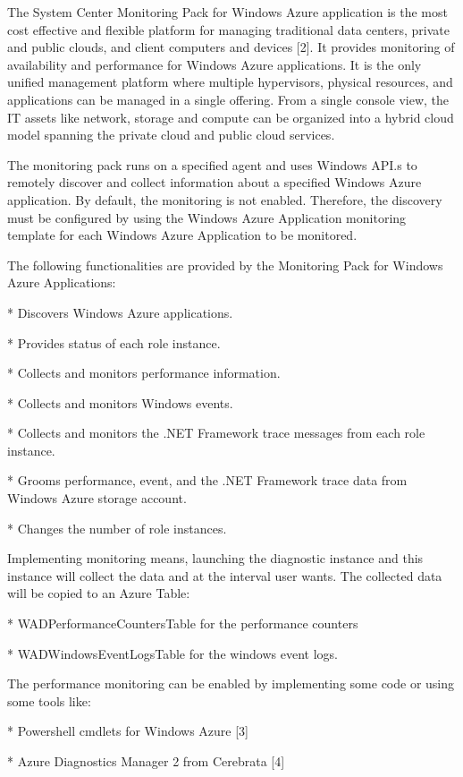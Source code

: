 \documentclass{sig-alternate}
\begin{document}
The System Center Monitoring Pack for Windows Azure application is the most cost effective and flexible platform for managing traditional data centers, private and public clouds, and client computers and devices [2]. It provides monitoring of availability and performance for Windows Azure applications. It is the only unified management platform where multiple hypervisors, physical resources, and applications can be managed in a single offering. From a single console view, the IT assets like network, storage and compute can be organized into a hybrid cloud model spanning the private cloud and public cloud services.

The monitoring pack runs on a specified agent and uses Windows API.s to remotely discover and collect information about a specified Windows Azure application. By default, the monitoring is not enabled. Therefore, the discovery must be configured by using the Windows Azure Application monitoring template for each Windows Azure Application to be monitored.

The following functionalities are provided by the Monitoring Pack for Windows Azure Applications:

* Discovers Windows Azure applications.

* Provides status of each role instance.

* Collects and monitors performance information.

* Collects and monitors Windows events.

* Collects and monitors the .NET Framework trace messages from each role instance.

* Grooms performance, event, and the .NET Framework trace data from Windows Azure storage account.

* Changes the number of role instances.

Implementing monitoring means, launching the diagnostic instance and this instance will collect the data and at the interval user wants. The collected data will be copied to an Azure Table:

* WADPerformanceCountersTable for the performance counters

* WADWindowsEventLogsTable for the windows event logs.

The performance monitoring can be enabled by implementing some code or using some tools like:

* Powershell cmdlets for Windows Azure [3]

* Azure Diagnostics Manager 2 from Cerebrata [4]
\end{document}
